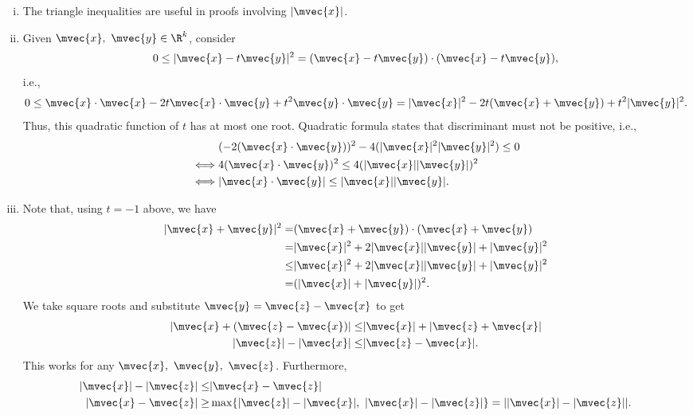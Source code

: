\begin{note}
	\begin{enumerate}[(i)]
		\item The triangle inequalities are useful in proofs involving \(|\mvec{x}|\).
		
		\item Given \(\mvec{x},~\mvec{y}\in\R^k\), consider 
		\begin{equation*}
			0\leq |\mvec{x}-t\mvec{y}|^2=(\mvec{x}-t\mvec{y})\cdot(\mvec{x}-t\mvec{y}),
		\end{equation*}
		i.e., 
		\begin{equation*}
			0\leq \mvec{x}\cdot\mvec{x}-2t\mvec{x}\cdot\mvec{y}+t^2\mvec{y}\cdot\mvec{y}=|\mvec{x}|^2-2t(\mvec{x}+\mvec{y})+t^2|\mvec{y}|^2.
		\end{equation*}
		Thus, this quadratic function of \(t\) has at most one root. Quadratic formula  states that discriminant must not be positive, i.e., 
		\begin{align*}
			&(-2(\mvec{x}\cdot\mvec{y}))^2-4(|\mvec{x}|^2|\mvec{y}|^2)\leq 0\\
			\iff& 4(\mvec{x}\cdot\mvec{y})^2\leq 4(|\mvec{x}||\mvec{y}|)^2\\
			\iff& |\mvec{x}\cdot\mvec{y}|\leq|\mvec{x}||\mvec{y}|.
		\end{align*}
		
		\item Note that, using \(t=-1\) above, we have 
		\begin{align*}
			|\mvec{x}+\mvec{y}|^2=&(\mvec{x}+\mvec{y})\cdot(\mvec{x}+\mvec{y})\\
			=&|\mvec{x}|^2+2|\mvec{x}||\mvec{y}|+|\mvec{y}|^2\\
			\leq&|\mvec{x}|^2+2|\mvec{x}||\mvec{y}|+|\mvec{y}|^2\\
			=&(|\mvec{x}|+|\mvec{y}|)^2.
		\end{align*}
		We take square roots and substitute \(\mvec{y}=\mvec{z}-\mvec{x}\) to get 
		\begin{align*}
			|\mvec{x}+(\mvec{z}-\mvec{x})|\leq& |\mvec{x}|+|\mvec{z}+\mvec{x}|\\
			|\mvec{z}|-|\mvec{x}|\leq&|\mvec{z}-\mvec{x}|.
		\end{align*}
		This works for any \(\mvec{x},~\mvec{y},~\mvec{z}\). Furthermore, 
		\begin{align*}
			|\mvec{x}|-|\mvec{z}|\leq& |\mvec{x}-\mvec{z}|\\
			|\mvec{x}-\mvec{z}|\geq&\operatorname{max}\{|\mvec{z}|-|\mvec{x}|,~|\mvec{x}|-|\mvec{z}|\}=||\mvec{x}|-|\mvec{z}||.
		\end{align*}
	\end{enumerate}
\end{note}
